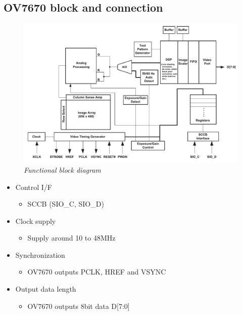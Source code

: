 \documentclass[D:/Latex/Internship/Report/Latex/Report.tex]{subfiles}
\begin{document}
			\subsection{OV7670 block and connection}
			\begin{figure}[ht!]
			\includegraphics[scale = 0.7]{Figure/OV7670_Functional.pdf}
			\caption{\it Functional block diagram}
			\end{figure}
			\begin{itemize}
				\item Control I/F 
				\begin{itemize}
					\item SCCB (SIO\_C, SIO\_D)
				\end{itemize}
				\item Clock supply
				\begin{itemize}
					\item Supply around 10 to 48MHz
				\end{itemize}
				\item Synchronization
				\begin{itemize}
					\item OV7670 outputs PCLK, HREF and VSYNC
				\end{itemize}
				\item Output data length
				\begin{itemize}
					\item OV7670 outputs 8bit data D[7:0]
				\end{itemize}
			\end{itemize}
\end{document}
